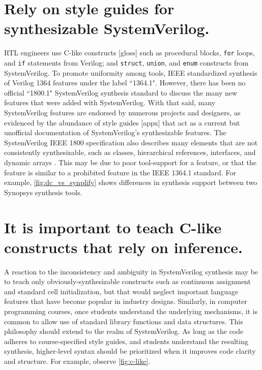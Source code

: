\FloatBarrier

\section{Rely on style guides for synthesizable SystemVerilog.}



RTL engineers use C-like constructs [gloss] such as procedural blocks, \texttt{for} loops, and \texttt{if} statements from Verilog; and \texttt{struct}, \texttt{union}, and \texttt{enum} constructs from SystemVerilog. To promote uniformity among tools, IEEE standardized synthesis of Verilog 1364 features under the label ``1364.1". However, there has been no official ``1800.1" SystemVerilog synthesis standard to discuss the many new features that were added with SystemVerilog. With that said, many SystemVerilog features are endorsed by numerous projects and designers, as evidenced by the abundance of style guides [appx] that act as a current but unofficial documentation of SystemVerilog's synthesizable features. The SystemVerilog IEEE 1800 specification also describes many elements that are not consistently synthesizable, such as classes, hierarchical references, interfaces, and dynamic arrays \cite{1800-2017, sutherland}. This may be due to poor tool-support for a feature, or that the feature is similar to a prohibited feature in the IEEE 1364.1 standard. For example, \autoref{fig:dc_vs_synplify} shows differences in synthesis support between two Synopsys synthesis tools.

\FloatBarrier

\section{It is important to teach C-like constructs that rely on inference.}



A reaction to the inconsistency and ambiguity in SystemVerilog synthesis may be to teach only obviously-synthesizable constructs such as continuous assignment and standard cell initialization, but that would neglect important language features that have become popular in industry designs. Similarly, in computer programming courses, once students understand the underlying mechanisms, it is common to allow use of standard library functions and data structures. This philosophy should extend to the realm of SystemVerilog. As long as the code adheres to course-specified style guides, and students understand the resulting synthesis, higher-level syntax should be prioritized when it improves code clarity and structure. For example, observe \autoref{fig:c-like}.

